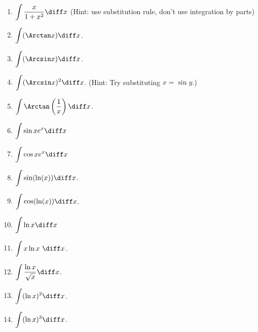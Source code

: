 \begin{multicols}{2}
\begin{enumerate}[ref={\fcProblemRef}]
\item $\displaystyle\int \frac{x}{1+x^2} \diff x$  (Hint: use substitution rule, don't use integration by parts)

\item \label{problemintarctanxdx}
$\displaystyle \int (\Arctan x) \diff x$.

\item 
$\displaystyle \int (\Arcsin x) \diff x
$.

\item \label{problemintArcsinSquared} $\displaystyle\int (\Arcsin x)^2 \diff x $. \quad \quad (Hint: Try substituting $x=\sin y$.)

\item 
$\displaystyle
\int\Arctan \left(\frac{1}x\right)\diff x
$.

\item \label{problemintsinxe^xdx} $\displaystyle \int \sin x e^x \diff x$

\item $\displaystyle \int \cos x e^x \diff x$

\item \label{problemintsin(ln x)dx}
$\displaystyle\int \sin (\ln (x)) \diff x $.

\item $\displaystyle\int \cos (\ln (x)) \diff x $.

\item \label{problemintlnxdx} $\displaystyle \int \ln x \diff x $

\item $\displaystyle \int x\ln x  ~ \diff x $.

\item \label{problemintlnx/sqrt(x)dx} $\displaystyle\int \frac{\ln x}{\sqrt{x}}\diff x $.

\item $\displaystyle\int (\ln x)^2 \diff x$.

\item $\displaystyle\int (\ln x)^3 \diff x$.


\end{enumerate}
\end{multicols}
